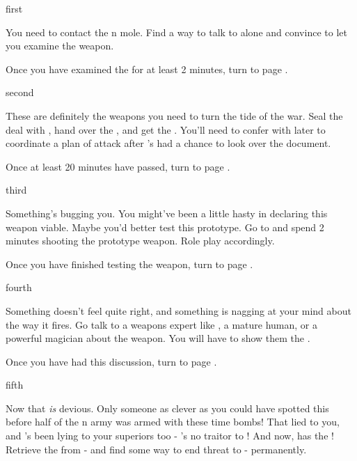 \documentclass[greennotebook]{NeptuneBall}
\begin{document}

\startnotebook{\nIllicitWeapons{}}

\begin{page}{first}

You need to contact the \pAtlantis{}n mole. Find a way to talk to \cGeneral{} alone and convince \cGeneral{\them} to let you examine the weapon.

Once you have examined the \iPrototype{} for at least 2 minutes, turn to page .

\end{page}

\begin{page}{second}

These are definitely the weapons you need to turn the tide of the war. Seal the deal with \cGeneral{}, hand over the \iBattlePlan{}, and get the \iPrototype{}. You'll need to confer with \cGeneral{\them} later to coordinate a plan of attack after \cGeneral{\they}'s had a chance to look over the document.  

Once at least 20 minutes have passed, turn to page .

\end{page}

\begin{page}{third}

Something's bugging you. You might've been a little hasty in declaring this weapon viable. Maybe you'd better test this prototype. Go to \sGardens{} and spend 2 minutes shooting the prototype weapon. Role play accordingly.

Once you have finished testing the weapon, turn to page .

\end{page}

\begin{page}{fourth}

Something doesn't feel quite right, and something is nagging at your mind about the way it fires. Go talk to a weapons expert like \cPrince{}, a mature human, or a powerful magician about the weapon. You will have to show them the \iPrototype{}. 

Once you have had this discussion, turn to page .

\end{page}

\begin{page}{fifth}

Now that \emph{is} devious. Only someone as clever as you could have spotted this before half of the \pPacifica{}n army was armed with these time bombs! That \cGeneral{} lied to you, and \cGeneral{\they}'s been lying to your superiors too - \cGeneral{\they}'s no traitor to \pAtlantis{}! And now, \cGeneral{\they} has the \iBattlePlan{\MYname}! Retrieve the \iBattlePlan{} from \cGeneral{\them} - and find some way to end \cGeneral{\their} threat to \pPacifica{} - permanently.

\end{page}

\endnotebook
\end{document}
